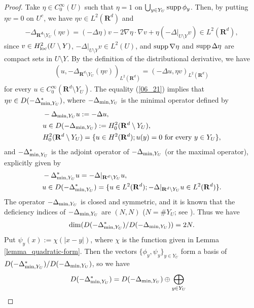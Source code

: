 \documentclass[12pt,a4paper]{article}
\def\supp{\mathop{\rm supp}\nolimits}
\def\min{\mathop{\rm min}\limits}
\begin{document}
\begin{proof}
Take $\eta\in C_0^\infty(U)$ such that $\eta=1$ 
on $\bigcup_{y\in Y_U}\supp \phi_y$.
Then, by putting $\eta v=0$ on $U^c$,
we have $\eta v\in L^2(\mathbf{R}^d)$ and
\begin{align*}
-\Delta_{\mathbf{R^d}\setminus Y_U}(\eta v)
=(-\Delta \eta)v-2\nabla\eta\cdot \nabla v
+\eta(-\Delta|_{U\setminus Y} v)
\in L^2(\mathbf{R}^d), 
\end{align*}
since $v\in H^2_{\rm loc}(U\setminus Y)$,
$-\Delta|_{U\setminus Y} v\in L^2(U)$,
and $\supp \nabla \eta$ and $\supp\Delta \eta$ 
are compact sets in $U\setminus Y$.
By the definition of the distributional derivative,
we have
\begin{align}
 (u,-\Delta_{\mathbf{R}^d\setminus Y_U}(\eta v))_{L^2(\mathbf{R}^d)}
=
 (-\Delta u,\eta v)_{L^2(\mathbf{R}^d)}
\label{06_21}
\end{align}
for every $u\in C_0^\infty(\mathbf{R}^d\setminus Y_U)$.
The equality (\ref{06_21}) implies that $\eta v\in D(-\Delta_{\min,Y_U}^*)$,
where $-\Delta_{\min ,Y_U}$ is the minimal operator defined by
\begin{align*}
& -\Delta_{\min ,Y_U}u :=-\Delta u,\\
&u\in D(-\Delta_{\min ,Y_U}):=H^2_0(\mathbf{R}^d\setminus Y_U),\\
&H^2_0(\mathbf{R}^d\setminus Y_U)
=\{u\in H^2(\mathbf{R}^d);u(y)=0\mbox{ for every }y\in Y_U\},
\end{align*}
and $-\Delta_{\min,Y_U}^*$ is the adjoint operator of $-\Delta_{\min,Y_U}$
(or the maximal operator),
explicitly given by
\begin{align*}
& -\Delta_{\min ,Y_U}^*u =-\Delta|_{\mathbf{R}^d\setminus Y_U}u,\\
&u\in D(-\Delta_{\min ,Y_U}^*)=
\{u\in L^2(\mathbf{R}^d);-\Delta|_{\mathbf{R}^d\setminus Y_U}u\in L^2(\mathbf{R}^d) \}.
\end{align*}
The operator $-\Delta_{\min ,Y_U}$ is closed and symmetric,
and it is known that the deficiency indices of 
$-\Delta_{\min ,Y_U}$ are $(N,N)$
($N=\# Y_U$; see \cite{Al-Ge-Ho-Ho}).
Thus we have
\begin{align*}
\dim(D(-\Delta_{\min ,Y_U}^*)/D(-\Delta_{\min ,Y_U}))=2N.
\end{align*}
Put $\psi_y(x):=\chi(|x-y|)$,
where $\chi$ is the function 
given in Lemma \ref{lemma_quadratic-form}.
Then the vectors $\{\phi_y,\psi_y\}_{y\in Y_U}$ 
form a basis of 
$D(-\Delta_{\min ,Y_U}^*)/ D(-\Delta_{\min ,Y_U})$,
so we have 
\begin{align*}
& D(-\Delta_{\min ,Y_U}^*)
=
D(-\Delta_{\min ,Y_U})\oplus\bigoplus_{y\in Y_U}

\end{align*}
\end{proof}
\end{document}
